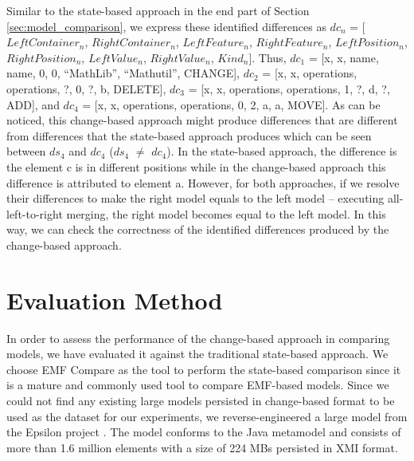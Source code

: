 \documentclass{jot}
\begin{document}
Similar to the state-based approach in the end part of Section \ref{sec:model_comparison}, we express these identified differences as $dc_{n}$ = [$LeftContainer_n$, $RightContainer_n$, $LeftFeature_n$, $RightFeature_n$, $LeftPosition_n$, $RightPosition_n$, $LeftValue_n$, $RightValue_n$, $Kind_n$]. Thus, $dc_{1}$ =  [\textsf{x}, \textsf{x}, \textsf{name}, \textsf{name}, 0, 0, ``MathLib'', ``Mathutil'', \textsf{CHANGE}], $dc_{2}$ = [\textsf{x}, \textsf{x}, \textsf{operations}, \textsf{operations}, ?, 0, ?, \textsf{b}, \textsf{DELETE}], $dc_{3}$ = [\textsf{x}, \textsf{x}, \textsf{operations}, \textsf{operations}, 1, ?, \textsf{d}, ?, \textsf{ADD}], and $dc_{4}$ = [\textsf{x}, \textsf{x}, \textsf{operations}, \textsf{operations}, 0, 2, \textsf{a}, \textsf{a}, \textsf{MOVE}]. As can be noticed, this change-based approach might produce differences that are different from differences that the state-based approach produces which can be seen between  $ds_{4}$ and $dc_{4}$ ($ds_{4}$ $\neq$ $dc_{4}$). In the state-based approach, the difference is the element \textsf{c} is in different positions while in the change-based approach this difference is attributed to element \textsf{a}. However, for both approaches, if we resolve their differences to make the right model equals to the left model -- executing all-left-to-right merging, the right model becomes equal to the left model. In this way, we can check the correctness of the identified differences produced by the change-based approach.

\section{Evaluation Method}
\label{sec:evaluation}

In order to assess the performance of the change-based approach in comparing models, we have evaluated it against the traditional state-based approach. We choose EMF Compare \cite{emfcompare2018developer,eclipse2017compare} as the tool to perform the state-based comparison since it is a mature and commonly used tool to compare EMF-based models. Since we could not find any existing large models persisted in change-based format to be used as the dataset for our experiments, we reverse-engineered a large model from the Epsilon project \cite{eclipse2018epsilongit,eclipse2017epsilon}. The model conforms to the Java metamodel \cite{eclipse2018modiscojava} and consists of more than 1.6 million elements with a size of 224 MBs persisted in XMI format. 
\end{document}
